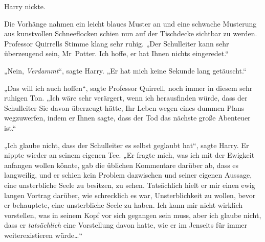 Harry nickte.

Die Vorhänge nahmen ein leicht blaues Muster an und eine schwache Musterung aus kunstvollen Schneeflocken schien nun auf der Tischdecke sichtbar zu werden. Professor Quirrells Stimme klang sehr ruhig.
„Der Schulleiter kann sehr überzeugend sein, Mr~Potter. Ich hoffe, er hat Ihnen nichts eingeredet.“

„Nein, \emph{Verdammt}“, sagte Harry.
„Er hat mich keine Sekunde lang getäuscht.“

„Das will ich auch hoffen“, sagte Professor Quirrell, noch immer in diesem sehr ruhigen Ton.
„Ich wäre sehr verärgert, wenn ich herausfinden würde, dass der Schulleiter Sie davon überzeugt hätte, Ihr Leben wegen eines dummen Plans wegzuwerfen, indem er Ihnen sagte, dass der Tod das nächste große Abenteuer ist.“

„Ich glaube nicht, dass der Schulleiter es selbst geglaubt hat“, sagte Harry. Er nippte wieder an seinem eigenen Tee.
„Er fragte mich, was ich mit der Ewigkeit anfangen wollen könnte, gab die üblichen Kommentare darüber ab, dass es langweilig, und er schien kein Problem dazwischen und seiner eigenen Aussage, eine unsterbliche Seele zu besitzen, zu sehen. Tatsächlich hielt er mir einen ewig langen Vortrag darüber, wie schrecklich es war, Unsterblichkeit zu wollen, bevor er behauptete, eine unsterbliche Seele zu haben. Ich kann mir nicht wirklich vorstellen, was in seinem Kopf vor sich gegangen sein muss, aber ich glaube nicht, dass er \emph{tatsächlich} eine Vorstellung davon hatte, wie er im Jenseits für immer weiterexistieren würde…“

